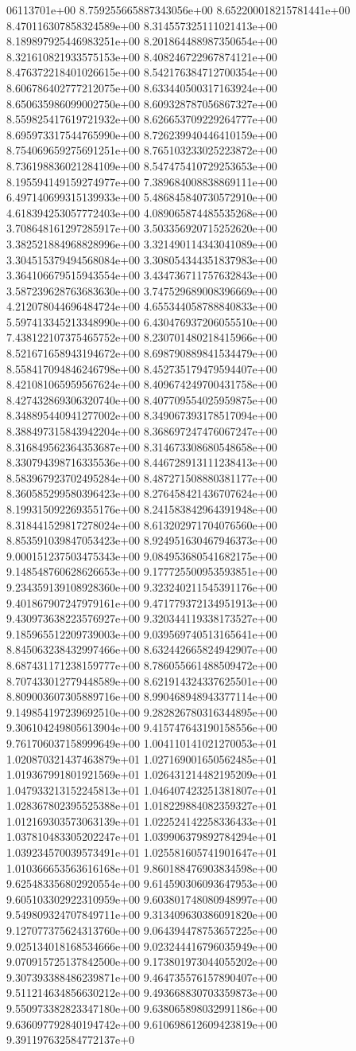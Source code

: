 06113701e+00	8.759255665887343056e+00	8.652200018215781441e+00	8.470116307858324589e+00	8.314557325111021413e+00	8.189897925446983251e+00	8.201864488987350654e+00	8.321610821933575153e+00	8.408246722967874121e+00	8.476372218401026615e+00	8.542176384712700354e+00	8.606786402777212075e+00	8.633440500317163924e+00	8.650635986099002750e+00	8.609328787056867327e+00	8.559825417619721932e+00	8.626653709229264777e+00	8.695973317544765990e+00	8.726239940446410159e+00	8.754069659275691251e+00	8.765103233025223872e+00	8.736198836021284109e+00	8.547475410729253653e+00	8.195594149159274977e+00	7.389684008838869111e+00	6.497140699315139933e+00	5.486845840730572910e+00	4.618394253057772403e+00	4.089065874485535268e+00	3.708648161297285917e+00	3.503356920715252620e+00	3.382521884968828996e+00	3.321490114343041089e+00	3.304515379494568084e+00	3.308054344351837983e+00	3.364106679515943554e+00	3.434736711757632843e+00	3.587239628763683630e+00	3.747529689008396669e+00	4.212078044696484724e+00	4.655344058788840833e+00	5.597413345213348990e+00	6.430476937206055510e+00	7.438122107375465752e+00	8.230701480218415966e+00	8.521671658943194672e+00	8.698790889841534479e+00	8.558417094846246798e+00	8.452735179479594407e+00	8.421081065959567624e+00	8.409674249700431758e+00	8.427432869306320740e+00	8.407709554025959875e+00	8.348895440941277002e+00	8.349067393178517094e+00	8.388497315843942204e+00	8.368697247476067247e+00	8.316849562364353687e+00	8.314673308680548658e+00	8.330794398716335536e+00	8.446728913111238413e+00	8.583967923702495284e+00	8.487271508880381177e+00	8.360585299580396423e+00	8.276458421436707624e+00	8.199315092269355176e+00	8.241583842964391948e+00	8.318441529817278024e+00	8.613202971704076560e+00	8.853591039847053423e+00	8.924951630467946373e+00	9.000151237503475343e+00	9.084953680541682175e+00	9.148548760628626653e+00	9.177725500953593851e+00	9.234359139108928360e+00	9.323240211545391176e+00	9.401867907247979161e+00	9.471779372134951913e+00	9.430973638223576927e+00	9.320344119338173527e+00	9.185965512209739003e+00	9.039569740513165641e+00	8.845063238432997466e+00	8.632442665824942907e+00	8.687431171238159777e+00	8.786055661488509472e+00	8.707433012779448589e+00	8.621914324337625501e+00	8.809003607305889716e+00	8.990468948943377114e+00	9.149854197239692510e+00	9.282826780316344895e+00	9.306104249805613904e+00	9.415747643190158556e+00	9.761706037158999649e+00	1.004110141021270053e+01	1.020870321437463879e+01	1.027169001650562485e+01	1.019367991801921569e+01	1.026431214482195209e+01	1.047933213152245813e+01	1.046407423251381807e+01	1.028367802395525388e+01	1.018229884082359327e+01	1.012169303573063139e+01	1.022524142258336433e+01	1.037810483305202247e+01	1.039906379892784294e+01	1.039234570039573491e+01	1.025581605741901647e+01	1.010366653563616168e+01	9.860188476903834598e+00	9.625483356802920554e+00	9.614590306093647953e+00	9.605103302922310959e+00	9.603801748080948997e+00	9.549809324707849711e+00	9.313409630386091820e+00	9.127077375624313760e+00	9.064394478753657225e+00	9.025134018168534666e+00	9.023244416796035949e+00	9.070915725137842500e+00	9.173801973044055202e+00	9.307393388486239871e+00	9.464735576157890407e+00	9.511214634856630212e+00	9.493668830703359873e+00	9.550973382823347180e+00	9.638065898032991186e+00	9.636097792840194742e+00	9.610698612609423819e+00	9.391197632584772137e+0